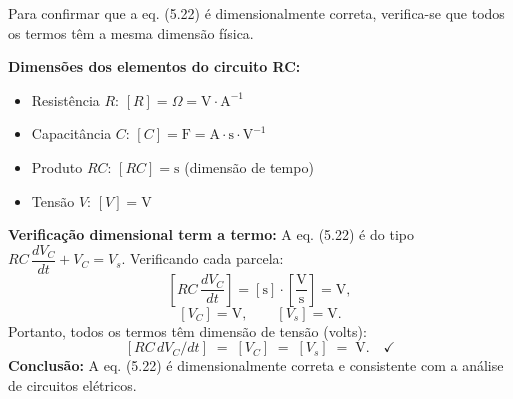 Para confirmar que a eq. (5.22) é dimensionalmente correta, verifica-se que todos os termos têm a mesma dimensão física.

\textbf{Dimensões dos elementos do circuito RC:}
\begin{itemize}
\item Resistência $R$: $[R] = \Omega = \mathrm{V\cdot A^{-1}}$
\item Capacitância $C$: $[C] = \mathrm{F} = \mathrm{A\cdot s\cdot V^{-1}}$
\item Produto $RC$: $[RC] = \mathrm{s}$ (dimensão de tempo)
\item Tensão $V$: $[V] = \mathrm{V}$
\end{itemize}

\textbf{Verificação dimensional term a termo:}
A eq. (5.22) é do tipo $RC\,\dfrac{dV_C}{dt} + V_C = V_s$. Verificando cada parcela:
\[
\left[RC\,\frac{dV_C}{dt}\right] = [\mathrm{s}]\cdot\left[\frac{\mathrm{V}}{\mathrm{s}}\right] = \mathrm{V},
\]
\[
[V_C] = \mathrm{V},\qquad [V_s] = \mathrm{V}.
\]
Portanto, todos os termos têm dimensão de tensão (volts):
\[
[RC\,dV_C/dt]\;=\;[V_C]\;=\;[V_s]\;=\;\mathrm{V}.\quad\checkmark
\]
\textbf{Conclusão:} A eq. (5.22) é dimensionalmente correta e consistente com a análise de circuitos elétricos. 